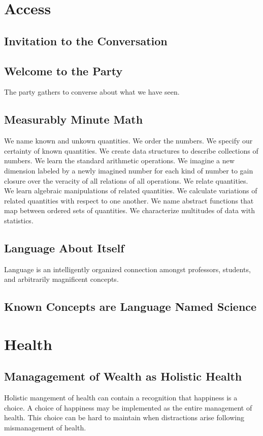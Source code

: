 
\tableofcontents

\part{Access}
\chapter{Invitation to the Conversation}

\chapter{Welcome to the Party}
The party gathers to converse about what we have seen.

\chapter{Measurably Minute Math}
We name known and unkown quantities.
We order the numbers.
We specify our certainty of known quantities.
We create data structures to describe collections of numbers.
We learn the standard arithmetic operations.
We imagine a new dimension labeled by a newly imagined number for each kind of number to gain closure over the veracity of all relations of all operations.
We relate quantities.
We learn algebraic manipulations of related quantities.
We calculate variations of related quantities with respect to one another.
We name abstract functions that map between ordered sets of quantities.
We characterize multitudes of data with statistics.

\chapter{Language About Itself}
Language is an intelligently organized connection amongst professors, students, and arbitrarily magnificent concepts.

\chapter{Known Concepts are Language Named Science}

\part{Health}
\chapter{Managagement of Wealth as Holistic Health}
Holistic mangement of health can contain a recognition that happiness is a choice.
A choice of happiness may be implemented as the entire management of health.
This choice can be hard to maintain when distractions arise following mismanagement of health.

